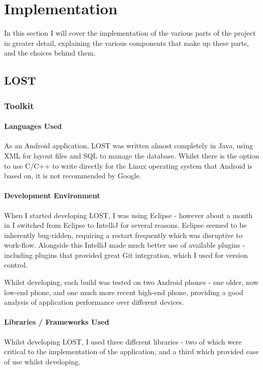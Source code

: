 \documentclass[11pt]{informatics-report}
\begin{document}
\chapter{Implementation}

In this section I will cover the implementation of the various parts of the project in greater detail, explaining the various components that make up these parts, and the choices behind them.

\section{LOST}

\subsection{Toolkit}

\subsubsection{Languages Used}
As an Android application, LOST was written almost completely in Java, using XML for layout files and SQL to manage the database. Whilst there is the option to use C/C++ to write directly for the Linux operating system that Android is based on, it is not recommended by Google.

\subsubsection{Development Environment}

When I started developing LOST, I was using Eclipse - however about a month in I switched from Eclipse to IntelliJ for several reasons. Eclipse seemed to be inherently bug-ridden, requiring a restart frequently which was disruptive to work-flow. Alongside this IntelliJ made much better use of available plugins - including plugins that provided great Git integration, which I used for version control. 

Whilst developing, each build was tested on two Android phones - one older, now low-end phone, and one much more recent high-end phone, providing a good analysis of application performance over different devices.

\subsubsection{Libraries / Frameworks Used}

Whilst developing LOST, I used three different libraries - two of which were critical to the implementation of the application, and a third which provided ease of use whilst developing. 
\end{document}
